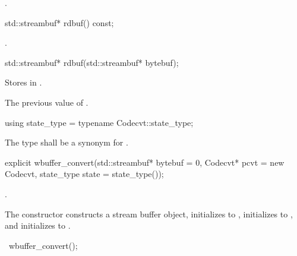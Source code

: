 \begin{itemdescr}
\pnum
\returns {}.
\end{itemdescr}

%
\begin{itemdecl}
std::streambuf* rdbuf() const;
\end{itemdecl}

\begin{itemdescr}
\pnum
\returns {}.
\end{itemdescr}

%
\begin{itemdecl}
std::streambuf* rdbuf(std::streambuf* bytebuf);
\end{itemdecl}

\begin{itemdescr}
\pnum
\effects Stores  in .

\pnum
\returns The previous value of .
\end{itemdescr}

%
\begin{itemdecl}
using state_type = typename Codecvt::state_type;
\end{itemdecl}

\begin{itemdescr}
\pnum
The type shall be a synonym for .
\end{itemdescr}

%
\begin{itemdecl}
explicit wbuffer_convert(std::streambuf* bytebuf = 0,
    Codecvt* pcvt = new Codecvt, state_type state = state_type());
\end{itemdecl}

\begin{itemdescr}
\pnum
\requires
{}.

\pnum
\effects The constructor constructs a stream buffer object, initializes
 to , initializes 
to , and initializes  to .
\end{itemdescr}

%
\begin{itemdecl}
~wbuffer_convert();
\end{itemdecl}

